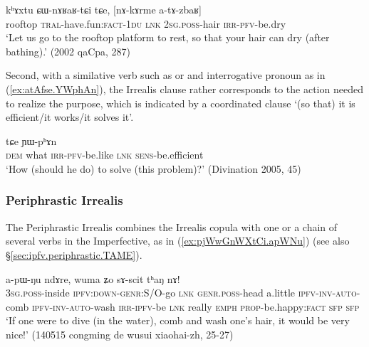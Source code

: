 \begin{exe}
\ex \label{ex:nAkArme.atAzbaR}
\gll kʰɤxtu ɕɯ-nɤʁaʁ-tɕi tɕe, [nɤ-kɤrme a-tɤ-zbaʁ] \\
rooftop \textsc{tral}-have.fun:\textsc{fact}-\textsc{1du} \textsc{lnk} \textsc{2sg}.\textsc{poss}-hair \textsc{irr}-\textsc{pfv}-be.dry \\
\glt `Let us go to the rooftop platform to rest, so that your hair can dry (after bathing).' (2002 qaCpa, 287)
\end{exe}

Second, with a similative verb such as  or  and interrogative pronoun as in (\ref{ex:atAfse.YWphAn}), the Irrealis clause rather corresponds to the action needed to realize the purpose, which is indicated by a coordinated clause  `(so that) it is efficient/it works/it solves it'. 

\begin{exe}
\ex \label{ex:atAfse.YWphAn}
 tɕe ɲɯ-pʰɤn \\
\textsc{dem} what \textsc{irr}-\textsc{pfv}-be.like \textsc{lnk} \textsc{sens}-be.efficient \\
\glt `How (should he do) to solve (this problem)?' (Divination 2005, 45)
\end{exe}
 
\subsubsection{Periphrastic Irrealis} \label{sec:irrealis.periphrastic}

The Periphrastic Irrealis combines the Irrealis copula  with one or a chain of several verbs in the Imperfective, as in (\ref{ex:pjWwGnWXtCi.apWNu}) (see also §\ref{sec:ipfv.periphrastic.TAME}). 

\begin{exe}
\ex \label{ex:pjWwGnWXtCi.apWNu}
 a-pɯ-ŋu ndɤre, wuma ʑo sɤ-scit tʰaŋ nɤ! \\
\textsc{3sg}.\textsc{poss}-inside \textsc{ipfv}:\textsc{down}-\textsc{genr}:S/O-go \textsc{lnk} \textsc{genr}.\textsc{poss}-head a.little \textsc{ipfv}-\textsc{inv}-\textsc{auto}-comb \textsc{ipfv}-\textsc{inv}-\textsc{auto}-wash \textsc{irr}-\textsc{ipfv}-be \textsc{lnk} really \textsc{emph} \textsc{prop}-be.happy:\textsc{fact} \textsc{sfp} \textsc{sfp} \\
\glt `If one were to dive (in the water), comb and wash one's hair, it would be very nice!' (140515 congming de wusui xiaohai-zh, 25-27)
\end{exe}

